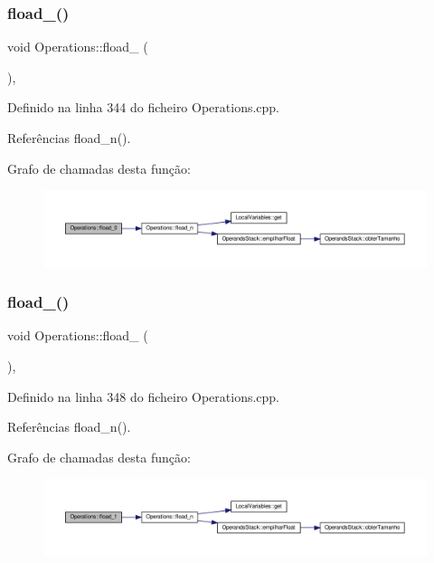 \subsubsection{\texorpdfstring{fload\+\_()}{fload\_0()}}
{\footnotesize\ttfamily void Operations\+::fload\+\_ (\begin{DoxyParamCaption}{ }\end{DoxyParamCaption})\hspace{0.3cm}{\ttfamily [static]}, {\ttfamily [private]}}



Definido na linha 344 do ficheiro Operations.\+cpp.



Referências fload\+\_\+n().

Grafo de chamadas desta função\+:\nopagebreak
\begin{figure}[H]
\begin{center}
\leavevmode
\includegraphics[width=350pt]{classOperations_a844c8a8d812c4f78c8f1024bbdac0548_cgraph}
\end{center}
\end{figure}
\mbox{\label{classOperations_a71611bd9fa43e8e170a35f3a5e1f0572}} 
\subsubsection{\texorpdfstring{fload\+\_()}{fload\_1()}}
{\footnotesize\ttfamily void Operations\+::fload\+\_ (\begin{DoxyParamCaption}{ }\end{DoxyParamCaption})\hspace{0.3cm}{\ttfamily [static]}, {\ttfamily [private]}}



Definido na linha 348 do ficheiro Operations.\+cpp.



Referências fload\+\_\+n().

Grafo de chamadas desta função\+:\nopagebreak
\begin{figure}[H]
\begin{center}
\leavevmode
\includegraphics[width=350pt]{classOperations_a71611bd9fa43e8e170a35f3a5e1f0572_cgraph}
\end{center}
\end{figure}
\mbox{\label{classOperations_a1d1767084d543ab73c8417efe11e195e}} 
